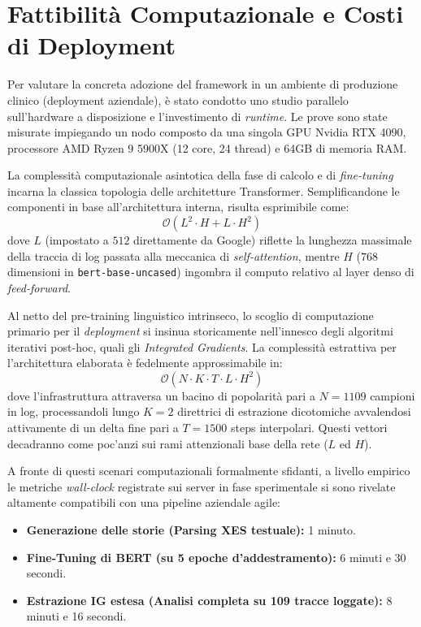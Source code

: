 \section{Fattibilità Computazionale e Costi di Deployment}
Per valutare la concreta adozione del framework in un ambiente di produzione clinico (deployment aziendale), è stato condotto uno studio parallelo sull'hardware a disposizione e l'investimento di \textit{runtime}. Le prove sono state misurate impiegando un nodo composto da una singola GPU Nvidia RTX 4090, processore AMD Ryzen 9 5900X (12 core, 24 thread) e 64GB di memoria RAM.

La complessità computazionale asintotica della fase di calcolo e di \textit{fine-tuning} incarna la classica topologia delle architetture Transformer. Semplificandone le componenti in base all'architettura interna, risulta esprimibile come:
\begin{equation}
\mathcal{O}(L^2 \cdot H + L \cdot H^2)
\end{equation}
dove $L$ (impostato a $512$ direttamente da Google) riflette la lunghezza massimale della traccia di log passata alla meccanica di \textit{self-attention}, mentre $H$ ($768$ dimensioni in \texttt{bert-base-uncased}) ingombra il computo relativo al layer denso di \textit{feed-forward}.

Al netto del pre-training linguistico intrinseco, lo scoglio di computazione primario per il \textit{deployment} si insinua storicamente nell'innesco degli algoritmi iterativi post-hoc, quali gli \textit{Integrated Gradients}. La complessità estrattiva per l'architettura elaborata è fedelmente approssimabile in:
\begin{equation}
\mathcal{O}(N \cdot K \cdot T \cdot L \cdot H^2)
\end{equation}
dove l'infrastruttura attraversa un bacino di popolarità pari a $N=1109$ campioni in log, processandoli lungo $K=2$ direttrici di estrazione dicotomiche avvalendosi attivamente di un delta fine pari a $T=1500$ steps interpolari. Questi vettori decadranno come poc'anzi sui rami attenzionali base della rete ($L$ ed $H$).

A fronte di questi scenari computazionali formalmente sfidanti, a livello empirico le metriche \textit{wall-clock} registrate sui server in fase sperimentale si sono rivelate altamente compatibili con una pipeline aziendale agile:
\begin{itemize}
    \item \textbf{Generazione delle storie (Parsing XES testuale):} 1 minuto.
    \item \textbf{Fine-Tuning di BERT (su 5 epoche d'addestramento):} 6 minuti e 30 secondi.
    \item \textbf{Estrazione IG estesa (Analisi completa su 109 tracce loggate):} 8 minuti e 16 secondi.
\end{itemize}

